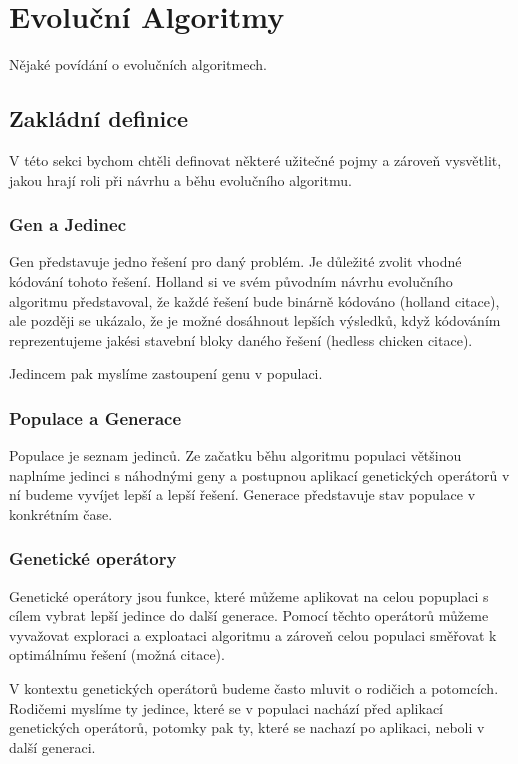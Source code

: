 \chapter{Evoluční Algoritmy}

Nějaké povídání o evolučních algoritmech.

\section{Zakládní definice}
V této sekci bychom chtěli definovat některé užitečné pojmy a zároveň vysvětlit, jakou hrají roli při návrhu a běhu evolučního algoritmu.

\subsection{Gen a Jedinec}
Gen představuje jedno řešení pro daný problém. Je důležité zvolit vhodné kódování tohoto řešení. Holland si ve svém původním návrhu evolučního algoritmu představoval, že každé řešení bude binárně kódováno (holland citace), ale později se ukázalo, že je možné dosáhnout lepších výsledků, když kódováním reprezentujeme jakési stavební bloky daného řešení (hedless chicken citace).

Jedincem pak myslíme zastoupení genu v populaci.

\subsection{Populace a Generace}
Populace je seznam jedinců. Ze začatku běhu algoritmu populaci většinou naplníme jedinci s náhodnými geny a postupnou aplikací genetických operátorů v ní budeme vyvíjet lepší a lepší řešení. Generace představuje stav populace v konkrétním čase.

\subsection{Genetické operátory}
Genetické operátory jsou funkce, které můžeme aplikovat na celou popuplaci s cílem vybrat lepší jedince do další generace. Pomocí těchto operátorů můžeme vyvažovat exploraci a exploataci algoritmu a zároveň celou populaci směřovat k optimálnímu řešení (možná citace).

V kontextu genetických operátorů budeme často mluvit o rodičich a potomcích. Rodičemi myslíme ty jedince, které se v populaci nachází před aplikací genetických operátorů, potomky pak ty, které se nachazí po aplikaci, neboli v další generaci. 

